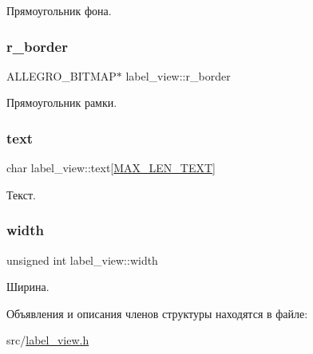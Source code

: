 Прямоугольник фона. 

\mbox{\label{structlabel__view_ad6815d541438d92064bfc49669d7dfda}} 
\subsubsection{\texorpdfstring{r\+\_\+border}{r\_border}}
{\footnotesize\ttfamily A\+L\+L\+E\+G\+R\+O\+\_\+\+B\+I\+T\+M\+AP$\ast$ label\+\_\+view\+::r\+\_\+border}



Прямоугольник рамки. 

\mbox{\label{structlabel__view_aac3274885e82ec3281d3bcc54af3b70d}} 
\subsubsection{\texorpdfstring{text}{text}}
{\footnotesize\ttfamily char label\+\_\+view\+::text\mbox{[}\hyperlink{label__view_8h_aae4d8e5464b3520e10b2215db631640b}{M\+A\+X\+\_\+\+L\+E\+N\+\_\+\+T\+E\+XT}\mbox{]}}



Текст. 

\mbox{\label{structlabel__view_a196519a4366ea711091a993276484d5e}} 
\subsubsection{\texorpdfstring{width}{width}}
{\footnotesize\ttfamily unsigned int label\+\_\+view\+::width}



Ширина. 



Объявления и описания членов структуры находятся в файле\+:\begin{DoxyCompactItemize}
\item 
src/\hyperlink{label__view_8h}{label\+\_\+view.\+h}\end{DoxyCompactItemize}
